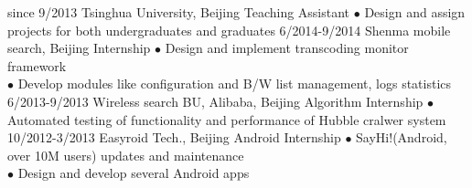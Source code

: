 \documentclass[]{friggeri-cv}
\begin{document}
\begin{entrylist}
  \entry
    {since 9/2013}
    {Tsinghua University, Beijing}
    {Teaching Assistant}
    {$\bullet$ Design and assign projects for both undergraduates and graduates}
  \entry
    {6/2014-9/2014}
    {Shenma mobile search, Beijing}
    {Internship}
    {$\bullet$ Design and implement transcoding monitor framework\\
    $\bullet$ Develop modules like configuration and B/W list management, logs statistics}
  \entry
    {6/2013-9/2013}
    {Wireless search BU, Alibaba, Beijing}
    {Algorithm Internship}
    {$\bullet$ Automated testing of functionality and performance of Hubble cralwer system}
  \entry
    {10/2012-3/2013}
    {Easyroid Tech., Beijing}
    {Android Internship}
    {$\bullet$ SayHi!(Android, over 10M users) updates and maintenance\\
    $\bullet$ Design and develop several Android apps}
\end{entrylist}
\end{document}
